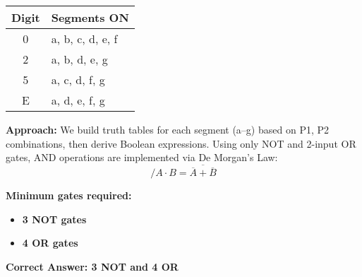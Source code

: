 \documentclass[12pt]{article}
\begin{document}
\begin{center}
\begin{tabular}{|c|l|}
\hline
Digit & Segments ON \\
\hline
0 & a, b, c, d, e, f \\
2 & a, b, d, e, g \\
5 & a, c, d, f, g \\
E & a, d, e, f, g \\
\hline
\end{tabular}
\end{center}

\vspace{1em}

\textbf{Approach:}  
We build truth tables for each segment (a–g) based on P1, P2 combinations, then derive Boolean expressions. Using only NOT and 2-input OR gates, AND operations are implemented via De Morgan’s Law:
\[/
A \cdot B = \overline{\overline{A} + \overline{B}}
\]

\vspace{1em}

\textbf{Minimum gates required:}
\begin{itemize}
  \item \textbf{3 NOT gates}
  \item \textbf{4 OR gates}
\end{itemize}

\textbf{Correct Answer:  3 NOT and 4 OR}
\end{document}
